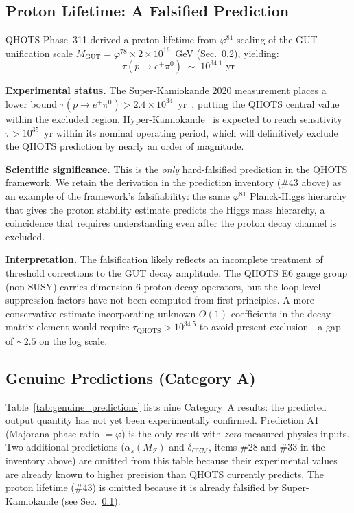 \documentclass[aps,prd,twocolumn,superscriptaddress,floatfix,nofootinbib]{revtex4-2}
\theoremstyle{definition}
\theoremstyle{remark}
\newcommand{\vp}{\varphi}
\begin{document}
\subsection{Proton Lifetime: A Falsified Prediction}
\label{sec:proton_lifetime_falsified}

QHOTS Phase~311 derived a proton lifetime from $\vp^{81}$ scaling of the GUT unification
scale $M_\text{GUT} = \vp^{78} \times 2 \times 10^{16}$~GeV (Sec.~\ref{sec:genuine_predictions}),
yielding:
\begin{equation}
\tau(p \to e^+\pi^0) \;\sim\; 10^{34.1}\text{ yr}
\end{equation}

\textbf{Experimental status.}  The Super-Kamiokande 2020 measurement places a lower bound
$\tau(p \to e^+\pi^0) > 2.4 \times 10^{34}$~yr~\cite{superk2020}, putting the QHOTS central
value within the excluded region.  Hyper-Kamiokande~\cite{hyperk} is expected to reach
sensitivity $\tau > 10^{35}$~yr within its nominal operating period, which will definitively
exclude the QHOTS prediction by nearly an order of magnitude.

\textbf{Scientific significance.}  This is the \emph{only} hard-falsified prediction in
the QHOTS framework.  We retain the derivation in the prediction inventory (\#43 above)
as an example of the framework's falsifiability: the same $\vp^{81}$ Planck-Higgs hierarchy
that gives the proton stability estimate predicts the Higgs mass hierarchy, a coincidence that
requires understanding even after the proton decay channel is excluded.

\textbf{Interpretation.}  The falsification likely reflects an incomplete treatment of
threshold corrections to the GUT decay amplitude.  The QHOTS E6 gauge group (non-SUSY)
carries dimension-6 proton decay operators, but the loop-level suppression factors have not
been computed from first principles.  A more conservative estimate incorporating unknown
$O(1)$ coefficients in the decay matrix element would require $\tau_\text{QHOTS} > 10^{34.5}$
to avoid present exclusion---a gap of $\sim 2.5$ on the log scale.

\subsection{Genuine Predictions (Category A)}
\label{sec:genuine_predictions}

Table~\ref{tab:genuine_predictions} lists nine Category~A results: the predicted output
quantity has not yet been experimentally confirmed.  Prediction A1 (Majorana phase ratio $=\vp$)
is the only result with \emph{zero} measured physics inputs.  Two additional predictions
($\alpha_s(M_Z)$ and $\delta_\text{CKM}$, items \#28 and \#33 in the inventory above)
are omitted from this table because their experimental values are already known to higher
precision than QHOTS currently predicts.  The proton lifetime (\#43) is omitted because it
is already falsified by Super-Kamiokande (see Sec.~\ref{sec:proton_lifetime_falsified}).
\end{document}
